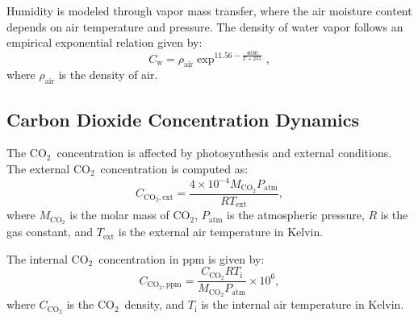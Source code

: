 \documentclass[conference]{IEEEtran}
\newcommand{\ui}[2]{#1_{\mathrm{#2}}}
\newcommand{\coo}{\ensuremath{\mathrm{CO_2}}}
\begin{document}
Humidity is modeled through vapor mass transfer, where the air moisture content depends on air temperature and pressure. The density of water vapor follows an empirical exponential relation given by:
\begin{equation}
    \ui{C}{w} = \ui{\rho}{air} \exp^{11.56 - \frac{4030}{T + 235}},
\end{equation}
where \(\ui{\rho}{air}\) is the density of air.


\subsection{Carbon Dioxide Concentration Dynamics}

The \coo\ concentration is affected by photosynthesis and external conditions. The external \coo\ concentration is computed as:
\begin{equation}
    \ui{C}{\coo,ext} = \frac{4 \times 10^{-4}  M_{\coo}  \ui{P}{atm}}{R  \ui{T}{ext}},
\end{equation}
where \(M_{\coo}\) is the molar mass of \coo, \(\ui{P}{atm}\) is the atmospheric pressure, \(R\) is the gas constant, and \(\ui{T}{ext}\) is the external air temperature in Kelvin.

The internal \coo\ concentration in ppm is given by:
\begin{equation}
    \ui{C}{\coo, ppm} = \frac{C_{\coo}  R  \ui{T}{i}}{M_{\coo}  \ui{P}{atm}} \times 10^6,
\end{equation}
where \(C_{\coo}\) is the \coo\ density, and \(\ui{T}{i}\) is the internal air temperature in Kelvin.
\end{document}
